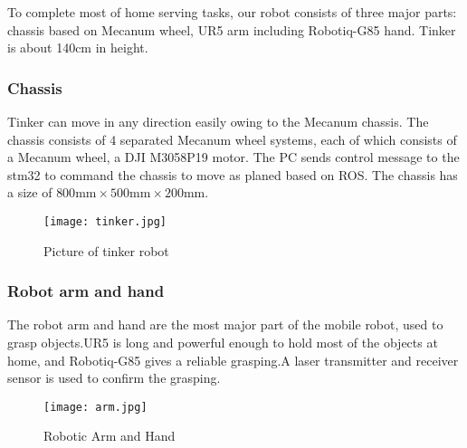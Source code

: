 To complete most of home serving tasks, our robot consists of three major parts: chassis based on Mecanum wheel, UR5 arm including Robotiq-G85 hand. Tinker is about 140cm in height. 
\subsubsection{Chassis}
Tinker can move in any direction easily owing to the Mecanum chassis. The chassis consists of 4 separated Mecanum wheel systems, each of which consists of a Mecanum wheel, a DJI M3058P19 motor. The PC sends control message to the stm32 to command the chassis to move as planed based on ROS. The chassis has a size of $800\text{mm} \times 500\text{mm}\times 200\text{mm}$.
\begin{figure}[!t]
\centering
\texttt{[image: tinker.jpg]}
    \caption{Picture of tinker robot}
\end{figure}

\subsubsection{Robot arm and hand}
The robot arm and hand are the most major part of the mobile robot, used to grasp objects.UR5 is long and powerful enough to hold most of the objects at home, and Robotiq-G85 gives a reliable grasping.A laser transmitter and receiver sensor is used to confirm the grasping.
\begin{figure*}[!t]
	\centering
    \texttt{[image: arm.jpg]}
    \caption{Robotic Arm and Hand}
\end{figure*}

